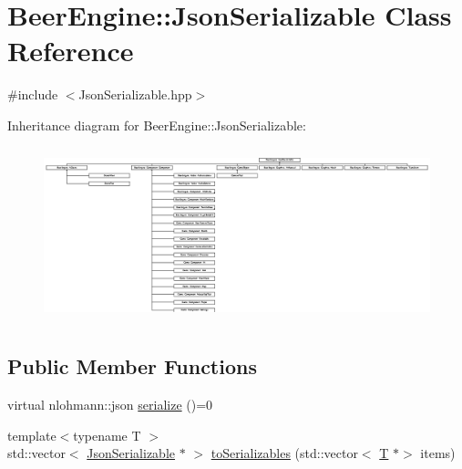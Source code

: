 \hypertarget{class_beer_engine_1_1_json_serializable}{}\section{Beer\+Engine\+:\+:Json\+Serializable Class Reference}
\label{class_beer_engine_1_1_json_serializable}


{\ttfamily \#include $<$Json\+Serializable.\+hpp$>$}

Inheritance diagram for Beer\+Engine\+:\+:Json\+Serializable\+:\begin{figure}[H]
\begin{center}
\leavevmode
\includegraphics[height=5.079365cm]{class_beer_engine_1_1_json_serializable}
\end{center}
\end{figure}
\subsection*{Public Member Functions}
\begin{DoxyCompactItemize}
\item 
virtual nlohmann\+::json \mbox{\hyperlink{class_beer_engine_1_1_json_serializable_a17689cbd8fe282c570bd026cc1be5b3b}{serialize}} ()=0
\item 
{\footnotesize template$<$typename T $>$ }\\std\+::vector$<$ \mbox{\hyperlink{class_beer_engine_1_1_json_serializable}{Json\+Serializable}} $\ast$ $>$ \mbox{\hyperlink{class_beer_engine_1_1_json_serializable_a80649111ff7da289151d17201f9e1d19}{to\+Serializables}} (std\+::vector$<$ \mbox{\hyperlink{namespace_beer_engine_a94f0b552f6dc910de8cdb44207981f53a8de48e594408f9fc561b2f68ce05f664}{T}} $\ast$$>$ items)
\end{DoxyCompactItemize}
